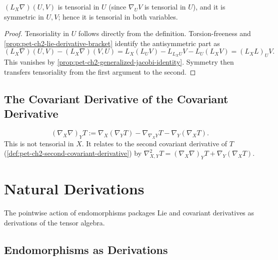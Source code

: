 \begin{remark}
  \label{rem:pet-ch2-lie-derivative-connection-symmetric}
  \leanok
  $(L_X\nabla)(U,V)$ is tensorial in $U$ (since $\nabla_UV$ is tensorial in
  $U$), and it is symmetric in $U,V$; hence it is tensorial in both
  variables.
\end{remark}
\begin{proof}
  \leanok
  \sketch
  Tensoriality in $U$
  follows directly from the definition. Torsion-freeness and
  \cref{prop:pet-ch2-lie-derivative-bracket} identify the antisymmetric part as
  \[
    (L_X\nabla)(U,V)-(L_X\nabla)(V,U)
      =L_X(L_UV)-L_{L_XU}V-L_U(L_XV)
      =(L_XL)_UV.
  \]
  This vanishes by
  \cref{prop:pet-ch2-generalized-jacobi-identity}. Symmetry then transfers
  tensoriality from the first argument to the second.
\end{proof}

\subsection{The Covariant Derivative of the Covariant Derivative}

\begin{definition}
  \label{def:pet-ch2-covariant-derivative-connection}
  \leanok
  \[
    (\nabla_X\nabla)_YT := \nabla_X(\nabla_YT)-\nabla_{\nabla_XY}T-\nabla_Y(\nabla_XT).
  \]
  This is not tensorial in $X$. It relates to the second covariant derivative
  of $T$ (\cref{def:pet-ch2-second-covariant-derivative}) by
  $\nabla^2_{X,Y}T=(\nabla_X\nabla)_YT+\nabla_Y(\nabla_XT)$.
\end{definition}

\section{Natural Derivations}

The pointwise action of endomorphisms packages Lie and covariant derivatives
as derivations of the tensor algebra.

\subsection{Endomorphisms as Derivations}

